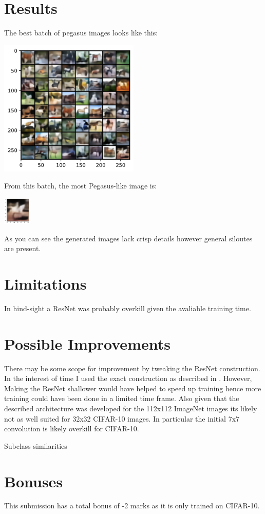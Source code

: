 \documentclass{article}
\begin{document}
\section{Results}
The best batch of pegasus images looks like this:
\begin{center}
    \includegraphics[width=0.5\textwidth]{figures/kinda_allright64.png}
\end{center}
From this batch, the most Pegasus-like image is:
\begin{center}
    \includegraphics[width=0.1\textwidth]{figures/kinda_allright1.png}
\end{center}

As you can see the generated images lack crisp details however general siloutes are present. 

\section{Limitations}
In hind-sight a ResNet was probably overkill given the avaliable training time.


\section{Possible Improvements}
There may be some scope for improvement by tweaking the ResNet construction. In the interest of time I used the exact construction as described in \cite{ResNet}. However, Making the ResNet shallower would have helped to speed up training hence more training could have been done in a limited time frame. Also given that the described architecture was developed for the 112x112 ImageNet images its likely not as well suited for 32x32 CIFAR-10 images. In particular the initial 7x7 convolution is likely overkill for CIFAR-10.

Subclass similarities


\section*{Bonuses}
This submission has a total bonus of -2 marks as it is only trained on CIFAR-10.

\printbibliography
\end{document}
